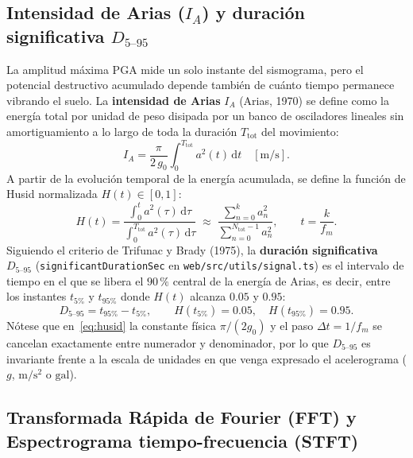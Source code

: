 \documentclass[11pt,a4paper]{article}
\newcommand{\src}[1]{\nolinkurl{#1}}
\newcommand{\dd}{\mathrm d}
\newcommand{\unit}[1]{\mathrm{#1}}
\begin{document}
\subsection{Intensidad de Arias (\texorpdfstring{$I_A$}{IA}) y duración significativa \texorpdfstring{$D_{5\text{--}95}$}{D5-95}}
\label{sec:sismo-arias}

La amplitud máxima $\mathrm{PGA}$ mide un solo instante del sismograma, pero el potencial destructivo acumulado
depende también de cuánto tiempo permanece vibrando el suelo. La \textbf{intensidad de Arias} $I_A$ (Arias, 1970)
se define como la energía total por unidad de peso disipada por un banco de osciladores lineales sin
amortiguamiento a lo largo de toda la duración $T_{\mathrm{tot}}$ del movimiento:
\begin{equation}
  I_A = \frac{\pi}{2\,g_0}\int_0^{T_{\mathrm{tot}}} a^2(t)\,\dd t\quad[\unit{m/s}].
  \label{eq:intensidad-arias}
\end{equation}
A partir de la evolución temporal de la energía acumulada, se define la función de Husid normalizada
$H(t)\in[0,1]$:
\begin{equation}
  H(t) = \frac{\displaystyle\int_0^t a^2(\tau)\,\dd\tau}{\displaystyle\int_0^{T_{\mathrm{tot}}} a^2(\tau)\,\dd\tau}
  \;\approx\;
  \frac{\displaystyle\sum_{n=0}^{k} a_n^2}{\displaystyle\sum_{n=0}^{N_{\mathrm{tot}}-1} a_n^2},
  \qquad t = \frac{k}{f_m}.
  \label{eq:husid}
\end{equation}
Siguiendo el criterio de Trifunac y Brady (1975), la \textbf{duración significativa} $D_{5\text{--}95}$
(\texttt{significantDurationSec} en \src{web/src/utils/signal.ts}) es el intervalo de tiempo en el que se
libera el $90\,\text{\%}$ central de la energía de Arias, es decir, entre los instantes $t_{5\%}$ y $t_{95\%}$ donde
$H(t)$ alcanza $0.05$ y $0.95$:
\begin{equation}
  D_{5\text{--}95} = t_{95\%} - t_{5\%},
  \qquad
  H(t_{5\%}) = 0.05,\quad H(t_{95\%}) = 0.95.
  \label{eq:duracion-d5-95}
\end{equation}
Nótese que en~\eqref{eq:husid} la constante física $\pi/(2g_0)$ y el paso $\Delta t = 1/f_m$ se cancelan
exactamente entre numerador y denominador, por lo que $D_{5\text{--}95}$ es invariante frente a la escala de
unidades en que venga expresado el acelerograma ($g$, $\unit{m/s^2}$ o $\unit{gal}$).

\subsection{Transformada Rápida de Fourier (FFT) y Espectrograma tiempo-frecuencia (STFT)}
\label{sec:sismo-fft-stft}
\end{document}
